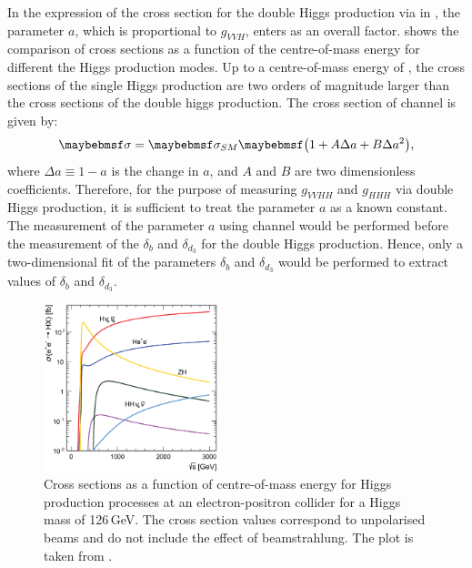 In the expression of the cross section for the double Higgs production via   in , the parameter $a$, which is proportional to $g_{VVH}$, enters as an overall factor.  shows the comparison of cross sections as a function of the centre-of-mass energy for different the Higgs production modes. Up to a centre-of-mass energy of , the cross sections of the single Higgs production are two orders of magnitude larger than the cross sections of the double higgs production. The cross section of   channel is given by:
\begin{equation}
\sigma = \sigma_{SM}\parenths{1 + A\Delta{a} + B\Delta{a}^2},
\end{equation}
where $\Delta{a}\equiv 1 - a$ is the change in $a$, and $A$ and $B$ are two dimensionless coefficients. Therefore, for the purpose of measuring $g_{VVHH}$ and $g_{HHH}$ via double Higgs production, it is sufficient to treat the parameter $a$ as a known constant. The measurement of the parameter $a$ using    channel would be performed before the measurement of the $\delta_{b}$ and $\delta_{d_3}$ for the double Higgs production. Hence, only a two-dimensional fit of the parameters $\delta_{b}$ and $\delta_{d_3}$ would be performed to extract values of $\delta_{b}$ and $\delta_{d_3}$.

\begin{figure}[!htbp]
\centering
\includegraphics[width=0.45\textwidth]{theory/HiggsCLICcrossSection}
\caption[]
{Cross sections as a function of centre-of-mass energy for Higgs production processes at an electron-positron collider for a Higgs mass of 126\,GeV. The cross section values correspond to unpolarised beams and do not include the effect of beamstrahlung. The plot is taken from \cite{Abramowicz:2016zbo}.}
\label{fig:theoryHiggsCrossSection}
\end{figure}



